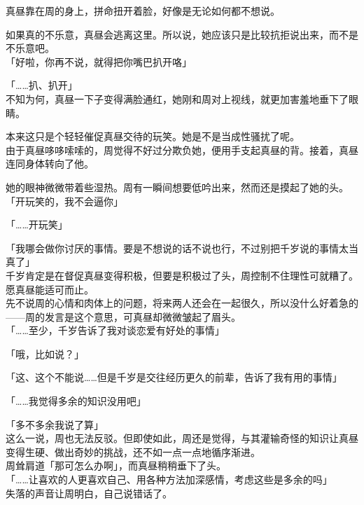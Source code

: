 真昼靠在周的身上，拼命扭开着脸，好像是无论如何都不想说。

如果真的不乐意，真昼会逃离这里。所以说，她应该只是比较抗拒说出来，而不是不乐意吧。\\

「好啦，你再不说，就得把你嘴巴扒开咯」

「……扒、扒开」\\

不知为何，真昼一下子变得满脸通红，她刚和周对上视线，就更加害羞地垂下了眼睛。

本来这只是个轻轻催促真昼交待的玩笑。她是不是当成性骚扰了呢。\\

由于真昼哆哆嗦嗦的，周觉得不好过分欺负她，便用手支起真昼的背。接着，真昼连同身体转向了他。

她的眼神微微带着些湿热。周有一瞬间想要低吟出来，然而还是摸起了她的头。\\

「开玩笑的，我不会逼你」

「……开玩笑」

「我哪会做你讨厌的事情。要是不想说的话不说也行，不过别把千岁说的事情太当真了」\\

千岁肯定是在督促真昼变得积极，但要是积极过了头，周控制不住理性可就糟了。愿真昼能适可而止。\\

先不说周的心情和肉体上的问题，将来两人还会在一起很久，所以没什么好着急的——周的发言是这个意思，可真昼却微微皱起了眉头。\\

「……至少，千岁告诉了我对谈恋爱有好处的事情」

「哦，比如说？」

「这、这个不能说……但是千岁是交往经历更久的前辈，告诉了我有用的事情」

「……我觉得多余的知识没用吧」

「多不多余我说了算」\\

这么一说，周也无法反驳。但即使如此，周还是觉得，与其灌输奇怪的知识让真昼变得生硬、做出奇妙的挑战，还不如一点一点地循序渐进。\\

周耸肩道「那可怎么办啊」，而真昼稍稍垂下了头。\\

「……让喜欢的人更喜欢自己、用各种方法加深感情，考虑这些是多余的吗」\\

失落的声音让周明白，自己说错话了。\\

